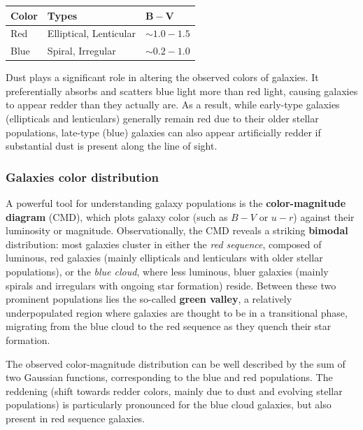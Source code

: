 \medskip

\begin{center}
\begin{tabular}{lll}
    \small
\textbf{Color} & \textbf{Types} & $\mathbf{B-V}$ \\
\hline
Red   & Elliptical, Lenticular & $\sim 1.0 - 1.5$ \\
Blue  & Spiral, Irregular      & $\sim 0.2 - 1.0$ \\
\end{tabular}
\end{center}

\medskip

Dust plays a significant role in altering the observed colors of galaxies. It preferentially absorbs and scatters blue light more than red light, causing galaxies to appear redder than they actually are. As a result, while early-type galaxies (ellipticals and lenticulars) generally remain red due to their older stellar populations, late-type (blue) galaxies can also appear artificially redder if substantial dust is present along the line of sight.

\subsubsection{Galaxies color distribution}

A powerful tool for understanding galaxy populations is the \textbf{color-magnitude diagram} (CMD), which plots galaxy color (such as $B-V$ or $u-r$) against their luminosity or magnitude. Observationally, the CMD reveals a striking \textbf{bimodal} distribution: most galaxies cluster in either the \emph{red sequence}, composed of luminous, red galaxies (mainly ellipticals and lenticulars with older stellar populations), or the \emph{blue cloud}, where less luminous, bluer galaxies (mainly spirals and irregulars with ongoing star formation) reside.
Between these two prominent populations lies the so-called \textbf{green valley}, a relatively underpopulated region where galaxies are thought to be in a transitional phase, migrating from the blue cloud to the red sequence as they quench their star formation.

The observed color-magnitude distribution can be well described by the sum of two Gaussian functions, corresponding to the blue and red populations. The reddening (shift towards redder colors, mainly due to dust and evolving stellar populations) is particularly pronounced for the blue cloud galaxies, but also present in red sequence galaxies.

